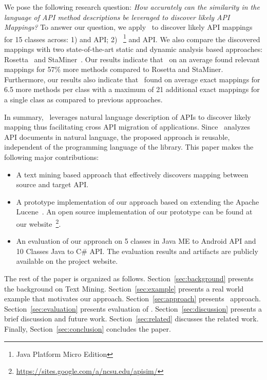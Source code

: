 We pose the following research question:
\textit{How accurately can the similarity in the language of API method descriptions
	be leveraged to discover likely API Mappings?}
To answer our question, we apply \tool\ to discover likely API mappings for 15 classes across:
1)  and  API; 2) ~\footnote{Java Platform Micro Edition} and  API.
We also compare the discovered mappings with two state-of-the-art static and dynamic analysis based approaches: Rosetta~\cite{Gokhale2013ICSE} and StaMiner~\cite{nguyen2014statistical}.
Our results indicate that \tool\ on an average found relevant mappings for 57\% more methods compared to Rosetta and StaMiner. 
Furthermore, our results also indicate that \tool\ found on average exact mappings for 6.5 more methods per class with a maximum of 21 additional exact mappings for a single class as compared to previous approaches.

In summary, \tool\ leverages natural language description of APIs to discover likely mapping thus facilitating cross API migration of applications. Since \tool\ analyzes API documents in natural language, the proposed approach is reusable, independent of the programming language of the library. This paper makes the following major contributions:
\begin{itemize}
	\item A text mining based approach that effectively discovers mapping between source and target API.
	\item A prototype implementation of our approach based on extending the Apache Lucene~\cite{lucene}. An open source implementation of our prototype can be found at our website~\footnote{\url{https://sites.google.com/a/ncsu.edu/apisim/}}. 
	\item An evaluation of our approach on 5 classes in Java ME to Android API and 10 Classes Java to C\# API. The evaluation results and artifacts are publicly available on the project website.
\end{itemize}


The rest of the paper is organized as follows.
Section~\ref{sec:background} presents the background on Text Mining.
Section~\ref{sec:example} presents a real world example that motivates our approach. Section~\ref{sec:approach} presents \tool\ approach.
Section~\ref{sec:evaluation} presents evaluation of \tool.
Section~\ref{sec:discussion} presents a brief discussion and future work.
Section~\ref{sec:related} discusses the related work.
Finally, Section~\ref{sec:conclusion} concludes the paper.


